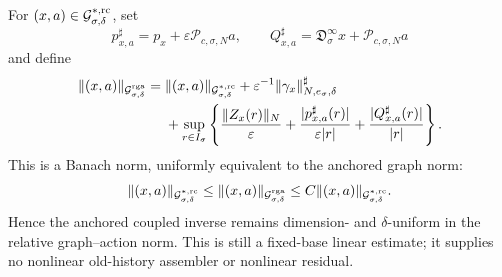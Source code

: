 \begin{proposition}
For \((x,a)\in\mathcal G_{\sigma,\delta}^{*,\rm rc}\), set
\[
 p_{x,a}^\sharp=p_x+\varepsilon\mathscr P_{c,\sigma,N}a,
 \qquad
 Q_{x,a}^\sharp=\mathfrak D_\sigma^\infty x
                    +\mathscr P_{c,\sigma,N}a
\]
and define
\begin{align}
 \|(x,a)\|_{\mathcal G_{\sigma,\delta}^{\rm rga}}
 ={}&\|(x,a)\|_{\mathcal G_{\sigma,\delta}^{*,\rm rc}}
 +\varepsilon^{-1}
       \|\gamma_x\|_{N,e_\sigma,\delta}^{\sharp}\notag\\
 &+\sup_{r\in I_\sigma}\left\{
   \frac{\|Z_x(r)\|_N}{\varepsilon}
  +\frac{|p_{x,a}^\sharp(r)|}{\varepsilon|r|}
  +\frac{|Q_{x,a}^\sharp(r)|}{|r|}\right\}.       \label{eq:relative-graph-action-norm}
\end{align}
This is a Banach norm, uniformly equivalent to the anchored graph norm:
\begin{equation}
 \|(x,a)\|_{\mathcal G_{\sigma,\delta}^{*,\rm rc}}
 \le\|(x,a)\|_{\mathcal G_{\sigma,\delta}^{\rm rga}}
 \le C\|(x,a)\|_{\mathcal G_{\sigma,\delta}^{*,\rm rc}}.       \label{eq:relative-graph-action-equivalence}
\end{equation}
Hence the anchored coupled inverse remains dimension- and
\(\delta\)-uniform in the relative graph--action norm.  This is still a
fixed-base linear estimate; it supplies no nonlinear old-history assembler
or nonlinear residual.
\end{proposition}


